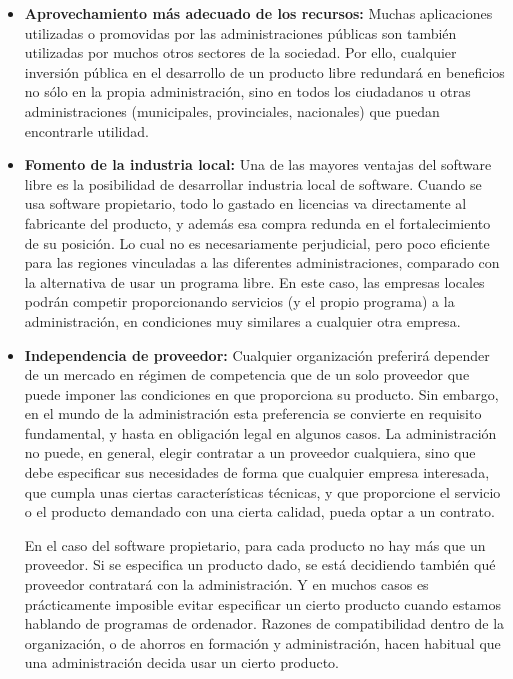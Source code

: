 \begin{itemize}
\item  \textbf{Aprovechamiento más adecuado de los recursos:} Muchas aplicaciones utilizadas o promovidas por las administraciones públicas son también utilizadas por muchos otros sectores de la sociedad. Por ello, cualquier inversión pública en el desarrollo de un producto libre redundará en beneficios no sólo en la propia administración, sino en todos los ciudadanos u otras administraciones (municipales, provinciales, nacionales) que puedan encontrarle utilidad.

\item  \textbf{Fomento de la industria local:} Una de las mayores ventajas del software libre es la posibilidad de desarrollar industria local de software. Cuando se usa software propietario, todo lo gastado en licencias va directamente al fabricante del producto, y además esa compra redunda en el fortalecimiento de su posición. Lo cual no es necesariamente perjudicial, pero poco eficiente para las regiones vinculadas a las diferentes administraciones, comparado con la alternativa de usar un programa libre. En este caso, las empresas locales podrán competir proporcionando servicios (y el propio programa) a la administración, en condiciones muy similares a cualquier otra empresa.

\item \textbf{Independencia de proveedor:} Cualquier organización preferirá depender de un mercado en régimen de competencia que de un solo proveedor que puede imponer las condiciones en que proporciona su producto. Sin embargo, en el mundo de la administración esta preferencia se convierte en requisito fundamental, y hasta en obligación legal en algunos casos. La administración no puede, en general, elegir contratar a un proveedor cualquiera, sino que debe especificar sus necesidades de forma que cualquier empresa interesada, que cumpla unas ciertas características técnicas, y que proporcione el servicio o el producto demandado con una cierta calidad, pueda optar a un contrato.

En el caso del software propietario, para cada producto no hay más que un proveedor. Si se especifica un producto dado, se está decidiendo también qué proveedor contratará con la administración. Y en muchos casos es prácticamente imposible evitar especificar un cierto producto cuando estamos hablando de programas de ordenador. Razones de compatibilidad dentro de la organización, o de ahorros en formación y administración, hacen habitual que una administración decida usar un cierto producto.


\end{itemize}
